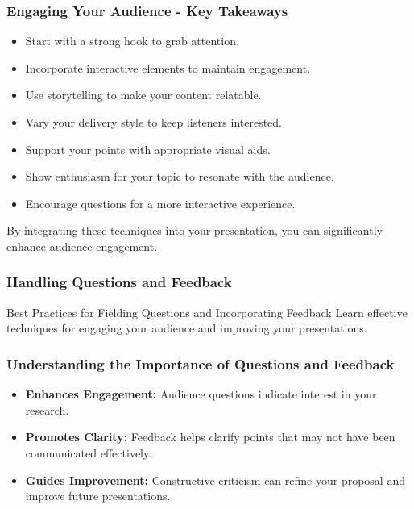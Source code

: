 \documentclass[aspectratio=169]{beamer}
\begin{document}
\begin{frame}[fragile]
  \frametitle{Engaging Your Audience - Key Takeaways}
  \begin{itemize}
    \item Start with a strong hook to grab attention.
    \item Incorporate interactive elements to maintain engagement.
    \item Use storytelling to make your content relatable.
    \item Vary your delivery style to keep listeners interested.
    \item Support your points with appropriate visual aids.
    \item Show enthusiasm for your topic to resonate with the audience.
    \item Encourage questions for a more interactive experience.
  \end{itemize}
  
  By integrating these techniques into your presentation, you can significantly enhance audience engagement.
\end{frame}

\begin{frame}[fragile]
  \frametitle{Handling Questions and Feedback}
  \begin{block}{Best Practices for Fielding Questions and Incorporating Feedback}
    Learn effective techniques for engaging your audience and improving your presentations.
  \end{block}
\end{frame}

\begin{frame}[fragile]
  \frametitle{Understanding the Importance of Questions and Feedback}
  \begin{itemize}
    \item \textbf{Enhances Engagement:} Audience questions indicate interest in your research.
    \item \textbf{Promotes Clarity:} Feedback helps clarify points that may not have been communicated effectively.
    \item \textbf{Guides Improvement:} Constructive criticism can refine your proposal and improve future presentations.
  \end{itemize}
\end{frame}
\end{document}
